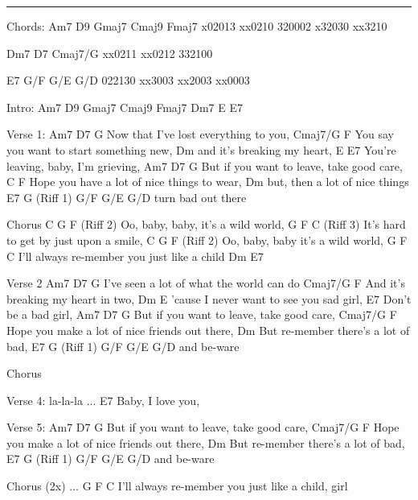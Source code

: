 \noindent\rule{\columnwidth}{1pt}

\begin{multicols}{2}
\begin{lstsong}
Chords:    
Am7     D9      Gmaj7   Cmaj9   Fmaj7
x02013  xx0210  320002  x32030  xx3210

Dm7     D7      Cmaj7/G
xx0211  xx0212  332100  

E7     G/F     G/E     G/D
022130 xx3003  xx2003  xx0003

Intro:
Am7  D9  Gmaj7  Cmaj9  Fmaj7  Dm7   E  E7

Verse 1:
Am7               D7                 G
   Now that I've lost everything to you,
           Cmaj7/G                    F
You say you want  to start something new,
           Dm
and it's breaking my heart,
          E      E7
You're leaving, baby, I'm grieving,
Am7                     D7               G
   But if you want to leave, take good care, 
                 C                     F
Hope you have a lot of nice things to wear,
            Dm
but, then a lot of nice things
      E7        G (Riff 1) G/F  G/E  G/D
turn bad out there
 
Chorus 
C     G                  F        (Riff 2)
Oo, baby, baby, it's a wild world,
G                 F                C (Riff 3)
 It's hard to get by just upon a smile,
 C     G                F        (Riff 2)
Oo, baby, baby it's a wild world,
G                 F                      C
 I'll always re-member you just like a child
Dm  E7


Verse 2
Am7            D7                     G
   I've seen a lot of what the world can do
         Cmaj7/G               F           
And it's breaking my heart in two,
          Dm                    E
'cause I never want to see you sad girl,
 E7
Don't be a bad girl,
Am7                      D7              G
     But if you want to leave, take good care,
               Cmaj7/G                   F
Hope you make a lot of nice friends out there,
        Dm 
But re-member there's a lot of bad,
E7      G (Riff 1) G/F  G/E  G/D
and be-ware

Chorus

Verse 4:
la-la-la ...
 E7              
Baby, I love you,

Verse 5:
Am7                      D7              G
     But if you want to leave, take good care,
               Cmaj7/G                   F
Hope you make a lot of nice friends out there,
        Dm 
But re-member there's a lot of bad,
E7      G (Riff 1) G/F  G/E  G/D
and be-ware
 
Chorus (2x) ...
G                 F                      C
 I'll always re-member you just like a child, girl
\end{lstsong}
\end{multicols}

